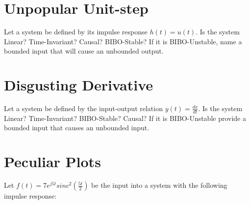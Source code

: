 \documentclass{article}
\begin{document}
\section{Unpopular Unit-step}

Let a system be defined by its impulse response $h(t) = u(t)$. Is the system Linear? Time-Invariant? Causal? BIBO-Stable? If it is BIBO-Unstable, name a bounded input that will cause an unbounded output.

\vspace{3cm}

\section{Disgusting Derivative}

Let a system be defined by the input-output relation $y(t) = \frac{dx}{dt}$. Is the system Linear? Time-Invariant? BIBO-Stable? Causal? If it is BIBO-Unstable provide a bounded input that causes an unbounded input.
\vfill

\section{Peculiar Plots}

Let $f(t) = 7e^{j5t} sinc^2(\frac{5t}{2})$ be the input into a system with the following impulse response:


\begin{figure}[h!]
    \centering
\end{figure}
\end{document}
